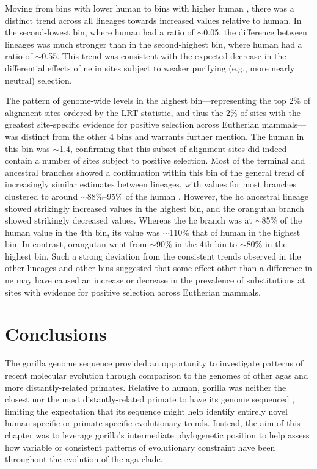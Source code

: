 Moving from bins with lower human \dnds to bins with higher human
\dnds, there was a distinct trend across all lineages towards
increased \dnds values relative to human. In the second-lowest bin,
where human had a \dnds ratio of $\sim$0.05, the \dnds difference
between lineages was much stronger than in the second-highest bin,
where human had a \dnds ratio of $\sim$0.55. This trend was consistent
with the expected decrease in the differential effects of \ac{ne} in
sites subject to weaker purifying (e.g., more nearly neutral)
selection.

The pattern of genome-wide \dnds levels in the highest bin---representing the top
2\% of alignment sites ordered by the LRT statistic, and thus the 2\%
of sites with the greatest site-specific evidence for positive
selection across Eutherian mammals---was distinct from the other 4
bins and warrants further mention. The human \dnds in this bin was
$\sim$1.4, confirming that this subset of alignment sites did indeed
contain a number of sites subject to positive selection. Most of the
terminal and ancestral branches showed a continuation within this bin
of the general trend of increasingly similar \dnds estimates between
lineages, with values for most branches clustered to around
$\sim$88\%--95\% of the human \dnds. However, the \ac{hc} ancestral
lineage showed strikingly increased \dnds values in the highest bin,
and the orangutan branch showed strikingly decreased values. Whereas
the \ac{hc} branch was at $\sim$85\% of the human value in the 4th
bin, its value was $\sim$110\% that of human in the highest bin. In
contrast, orangutan went from $\sim$90\% in the 4th bin to $\sim$80\%
in the highest bin. Such a strong deviation from the consistent trends
observed in the other lineages and other bins suggested that some
effect other than a difference in \ac{ne} may have caused an increase
or decrease in the prevalence of \nsyn substitutions at sites with
evidence for positive selection across Eutherian mammals.

\section{Conclusions}

The gorilla genome sequence provided an opportunity to investigate
patterns of recent molecular evolution through comparison to the
genomes of other \acp{aga} and more distantly-related
primates. Relative to human, gorilla was neither the closest
\citep{Sequencing2005a} nor the most distantly-related primate to have
its genome sequenced \citep{Macaque2007,Locke2011}, limiting the
expectation that its sequence might help identify entirely novel
human-specific or primate-specific evolutionary trends. Instead, the
aim of this chapter was to leverage gorilla's intermediate
phylogenetic position to help assess how variable or consistent
patterns of evolutionary constraint have been throughout the evolution
of the \ac{aga} clade.

